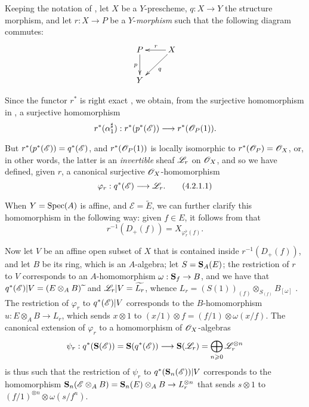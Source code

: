 \begin{env}[4.2.1]
\label{II.4.2.1}
Keeping the notation of , let $X$ be a $Y$-prescheme, $q:X\to Y$ the structure morphism, and let $r:X\to P$ be a $Y$-\emph{morphism} such that the following diagram commutes:
\[
  \xymatrix{
    P \ar[d]_p & X \ar[l]_r \ar[dl]^q
  \\Y
  }
\]

Since the functor $r^*$ is right exact , we obtain, from the surjective homomorphism in , a surjective homomorphism
\[
  r^*(\alpha_1^\sharp): r^*(p^*(\sh{E})) \to r^*(\sh{O}_P(1)).
\]

But $r^*(p^*(\mathscr{E}))=q^*(\mathscr{E})$, and $r^*(\mathscr{O}_P(1))$ is locally isomorphic to $r^*(\mathscr{O}_P)=\mathscr{O}_X$, or, in other words, the latter is an \emph{invertible} sheaf $\mathscr{L}_r$ on $\mathscr{O}_X$, and so we have defined, given $r$, a canonical surjective $\mathscr{O}_X$-homomorphism
\[
\label{II.4.2.1.1}
  \varphi_r:q^*(\sh{E}) \to \sh{L}_r.
  \tag{4.2.1.1}
\]

When $Y=\operatorname{Spec}(A)$ is affine, and $\mathscr{E}=\widetilde{E}$, we can further clarify this homomorphism in the following way:
given $f\in E$, it follows from  that
\[
\label{II.4.2.1.2}
  r^{-1}(D_+(f)) = X_{\varphi_r^\flat(f)}.
  \tag{4.2.1.2}
\]

Now let $V$ be an affine open subset of $X$ that is contained inside $r^{-1}(D_+(f))$, and let $B$ be its ring, which is an $A$-algebra;
let $S=\mathbf{S}_A(E)$;
the restriction of $r$ to $V$ corresponds to an $A$-homomorphism $\omega:\bb{S}_f\to B$, and we have that $q^*(\mathscr{E})|V = (E\otimes_A B)\,\widetilde{\,}$ and $\mathscr{L}_r|V = \widetilde{L_r}$, whence $L_r = (S(1))_{(f)}\otimes_{S_{(f)}}B_{[\omega]}$ .
The restriction of $\varphi_r$ to $q^*(\mathscr{E})|V$ corresponds to the $B$-homomorphism $u:E\otimes_A B\to L_r$, which sends $x\otimes1$ to $(x/1)\otimes f = (f/1)\otimes\omega(x/f)$.
The canonical extension of $\varphi_r$ to a homomorphism of $\mathscr{O}_X$-algebras
\[
  \psi_r: q^*(\bb{S}(\sh{E})) = \bb{S}(q^*(\sh{E})) \to \bb{S}(\sh{L}_r) = \bigoplus_{n\geq0}\sh{L}_r^{\otimes n}
\]
is thus such that the restriction of $\psi_r$ to $q^*(\mathbf{S}_n(\mathscr{E}))|V$ corresponds to the homomorphism $\bb{S}_n(\sh{E}\otimes_A B) = \bb{S}_n(E)\otimes_A B \to L_r^{\otimes n}$ that sends $s\otimes1$ to $(f/1)^{\otimes n}\otimes\omega(s/f^n)$.
\end{env}

